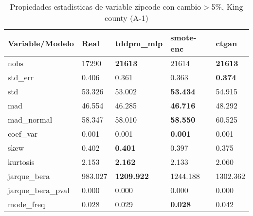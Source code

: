 \begin{table}[H]
\centering
\fontsize{8}{14}\selectfont
\caption{Propiedades estadisticas de variable zipcode con cambio\ensuremath{>}5\%, King county (A-1)}
\label{table-stats-king county-a-1-zipcode-short}
\begin{tabular}{|l|m{10em}|m{10em}|m{10em}|m{10em}|}
\hline
 \rowcolor[gray]{0.8}
Variable/Modelo & Real & tddpm\_mlp & smote-enc & ctgan \\
\hline nobs & 17290 & \bfseries 21613 & \cellcolor[rgb]{0.9, 0.54, 0.52} 21614 & \bfseries 21613 \\
\hline std\_err & 0.406 & \cellcolor[rgb]{0.9, 0.54, 0.52} 0.361 & 0.363 & \bfseries 0.374 \\
\hline std & 53.326 & 53.002 & \bfseries 53.434 & \cellcolor[rgb]{0.9, 0.54, 0.52} 54.915 \\
\hline mad & 46.554 & 46.285 & \bfseries 46.716 & \cellcolor[rgb]{0.9, 0.54, 0.52} 48.292 \\
\hline mad\_normal & 58.347 & 58.010 & \bfseries 58.550 & \cellcolor[rgb]{0.9, 0.54, 0.52} 60.525 \\
\hline coef\_var & 0.001 & 0.001 & \bfseries 0.001 & \cellcolor[rgb]{0.9, 0.54, 0.52} 0.001 \\
\hline skew & 0.402 & \bfseries 0.401 & 0.397 & \cellcolor[rgb]{0.9, 0.54, 0.52} 0.375 \\
\hline kurtosis & 2.153 & \bfseries 2.162 & 2.133 & \cellcolor[rgb]{0.9, 0.54, 0.52} 2.060 \\
\hline jarque\_bera & 983.027 & \bfseries 1209.922 & 1244.188 & \cellcolor[rgb]{0.9, 0.54, 0.52} 1302.362 \\
\hline jarque\_bera\_pval & 0.000 & 0.000 & 0.000 & 0.000 \\
\hline mode\_freq & 0.028 & 0.029 & \bfseries 0.028 & \cellcolor[rgb]{0.9, 0.54, 0.52} 0.042 \\
\hline
\end{tabular}
\end{table}
